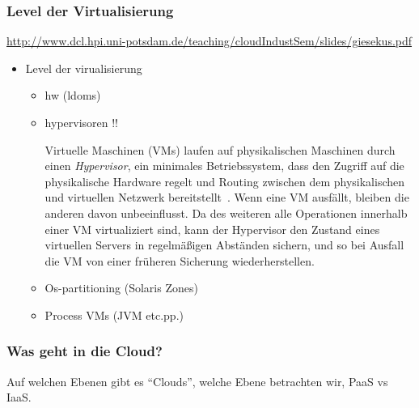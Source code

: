 \documentclass[draft,journal]{IEEEtran}
\begin{document}
\subsubsection{Level der Virtualisierung}
\label{sec:def-virtualisierung}
\url{http://www.dcl.hpi.uni-potsdam.de/teaching/cloudIndustSem/slides/giesekus.pdf}
\begin{itemize}
\item Level der virualisierung
  \begin{itemize}
  \item hw (ldoms)
  \item hypervisoren !!
    
    Virtuelle Maschinen (VMs) laufen auf physikalischen Maschinen durch
    einen \emph{Hypervisor}, ein minimales Betriebssystem, dass den
    Zugriff auf die physikalische Hardware regelt und Routing zwischen dem
    physikalischen und virtuellen Netzwerk
    bereitstellt~\cite{tanenbaum1992modern}. Wenn eine VM ausfällt,
    bleiben die anderen davon unbeeinflusst. Da des weiteren alle
    Operationen innerhalb einer VM virtualiziert sind, kann der Hypervisor
    den Zustand eines virtuellen Servers in regelmäßigen Abständen
    sichern, und so bei Ausfall die VM von einer früheren Sicherung
    wiederherstellen.

  \item Os-partitioning (Solaris Zones)
  \item Process VMs (JVM etc.pp.)
  \end{itemize}
\end{itemize}

\subsubsection{Was geht in die Cloud?}
Auf welchen Ebenen gibt es "`Clouds"', welche Ebene betrachten wir,
PaaS vs IaaS.
\end{document}
